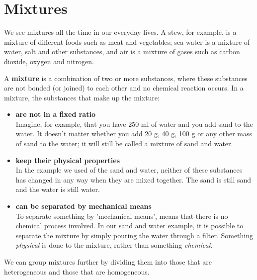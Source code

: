             \section{Mixtures}
            \nopagebreak
            \label{m38708*id62584}We see mixtures all the time in our everyday lives. A stew, for example, is a mixture of different foods such as meat and vegetables; sea water is a mixture of water, salt and other substances, and air is a mixture of gases such as carbon dioxide, oxygen and nitrogen.\par \pagebreak
\label{m38708*fhsst!!!underscore!!!id69}
 {\label{m38708*meaningfhsst!!!underscore!!!id69}
      A \textbf{mixture} is a combination of two or more substances, where these substances are not bonded (or joined) to each other and no chemical reaction occurs. 
       } 
      \label{m38708*id62612}In a mixture, the substances that make up the mixture:\par 
      \label{m38708*id62615}\begin{itemize}[noitemsep]
            \label{m38708*uid2}\item \textbf{are not in a fixed ratio} \\
Imagine, for example, that you have 250 ml of water and you add sand to the water. It doesn't matter whether you add 20 g, 40 g, 100 g or any other mass of sand to the water; it will still be called a mixture of sand and water.
\label{m38708*uid3}\item \textbf{keep their physical properties} \\
In the example we used of the sand and water, neither of these substances has changed in any way when they are mixed together. The sand is still sand and the water is still water.
\label{m38708*uid4}\item \textbf{can be separated by mechanical means} \\
To separate something by 'mechanical means', means that there is no chemical process involved. In our sand and water example, it is possible to separate the mixture by simply pouring the water through a filter. Something \textsl{physical} is done to the mixture, rather than something \textsl{chemical}.
\end{itemize}
      \label{m38708*id62700}We can group mixtures further by dividing them into those that are heterogeneous and those that are homogeneous.\par 

      \label{m38708*uid5}

